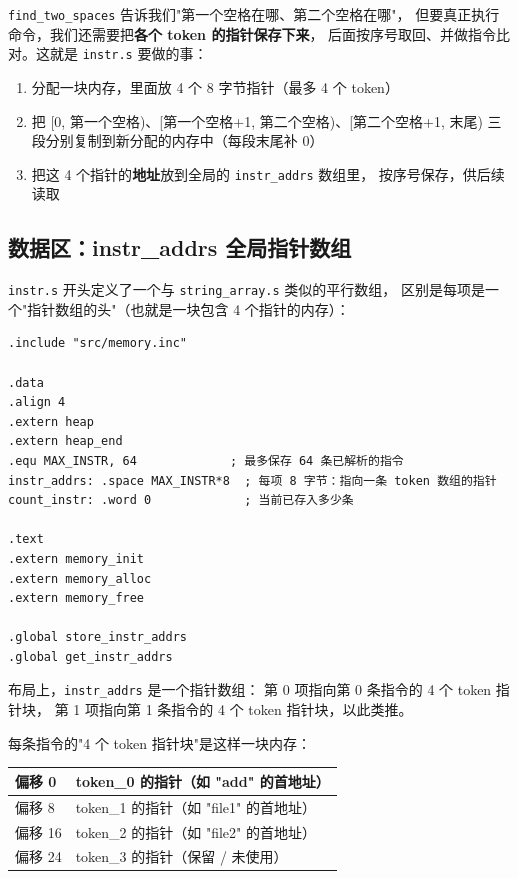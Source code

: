 
\texttt{find\_two\_spaces} 告诉我们"第一个空格在哪、第二个空格在哪"，
但要真正执行命令，我们还需要把\textbf{各个 token 的指针保存下来}，
后面按序号取回、并做指令比对。这就是 \texttt{instr.s} 要做的事：

\begin{enumerate}
    \item 分配一块内存，里面放 4 个 8 字节指针（最多 4 个 token）
    \item 把 [0, 第一个空格)、[第一个空格+1, 第二个空格)、[第二个空格+1, 末尾)
        三段分别复制到新分配的内存中（每段末尾补 0）
    \item 把这 4 个指针的\textbf{地址}放到全局的 \texttt{instr\_addrs} 数组里，
        按序号保存，供后续读取
\end{enumerate}

\subsection{数据区：instr\_addrs 全局指针数组}

\texttt{instr.s} 开头定义了一个与 \texttt{string\_array.s} 类似的平行数组，
区别是每项是一个"指针数组的头"（也就是一块包含 4 个指针的内存）：

\begin{lstlisting}[style=asm, caption=instr.s — 数据区定义]
.include "src/memory.inc"

.data
.align 4
.extern heap
.extern heap_end
.equ MAX_INSTR, 64             ; 最多保存 64 条已解析的指令
instr_addrs: .space MAX_INSTR*8  ; 每项 8 字节：指向一条 token 数组的指针
count_instr: .word 0             ; 当前已存入多少条

.text
.extern memory_init
.extern memory_alloc
.extern memory_free

.global store_instr_addrs
.global get_instr_addrs
\end{lstlisting}

布局上，\texttt{instr\_addrs} 是一个指针数组：
第 0 项指向第 0 条指令的 4 个 token 指针块，
第 1 项指向第 1 条指令的 4 个 token 指针块，以此类推。

每条指令的"4 个 token 指针块"是这样一块内存：

\begin{center}
\begin{tabular}{|l|l|}
\hline
偏移 0  & token\_0 的指针（如 "add" 的首地址） \\
\hline
偏移 8  & token\_1 的指针（如 "file1" 的首地址） \\
\hline
偏移 16 & token\_2 的指针（如 "file2" 的首地址） \\
\hline
偏移 24 & token\_3 的指针（保留 / 未使用） \\
\hline
\end{tabular}
\end{center}

